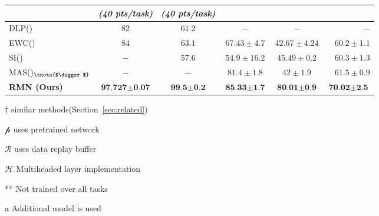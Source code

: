 \documentclass{article}
\begin{document}
\begin{table*}[t]
\begin{center}
\begin{small}
\begin{sc}
\begin{threeparttable}
\begin{tabular}{lccccr}
    & \textit{(40 pts/task)} & \textit{(40 pts/task)} \\
    \midrule\midrule
    DLP(\cite{esk03}) & $82$ & $61.2$ & $-$& $-$ & $-$ \\
    EWC(\cite{kirkpatrick2017overcoming}) & $84$ & $63.1$ & $67.43 \pm 4.7$\tnote{$\mathcal{H}$} & $42.67 \pm 4.24$\tnote{$\mathcal{H}$} & $60.2 \pm 1.1$\tnote{$\mathcal{H}$} \\
    SI(\cite{zenke2017continual}) & $-$ & $57.6$ & $54.9\pm16.2$ & $45.49\pm0.2$\tnote{$\mathcal{H}$} & $60.3\pm1.3$\tnote{$\mathcal{H}$}\\
    MAS(\cite{ferrari_memory_2018})$_{\tnote{$\dagger$}}$ \tnote{$\mathcal{H}$} & $-$ & $-$ & $81.4 \pm 1.8$ & $42\pm1.9$ & $61.5 \pm 0.9$\\
    \textbf{RMN (Ours)} & $\textbf{97.727} \pm \textbf{0.07}$ & $\textbf{99.5} \pm \textbf{0.2}$ & $\textbf{85.33} \pm \textbf{1.7}$ & $\textbf{80.01} \pm \textbf{0.9}$ & $\textbf{70.02} \pm \textbf{2.5}$ \\
    \bottomrule
    \end{tabular}
    \begin{tablenotes}[para]\footnotesize
    \item[$\dagger$] similar methods(Section~\ref{sec:related})
    \item[$\mathcal{p}$] uses pretrained network
    \item[$\mathcal{R}$] uses data replay buffer
    \item[$\mathcal{H}$] Multiheaded layer implementation
    \item[**] Not trained over all tasks
    \item[a] Additional model is used
    \end{tablenotes}
    \end{threeparttable}
    \end{sc}
    \end{small}
    \end{center}
    \vskip -0.1in
\end{table*}
\end{document}
